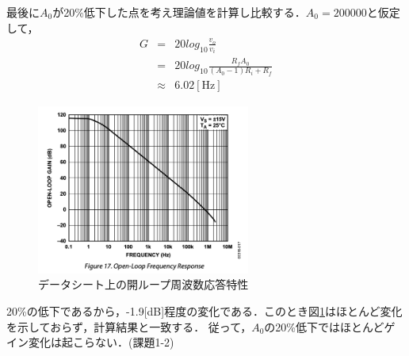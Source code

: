 \documentclass[dvipdfmx,titlepage,a4j]{jsarticle}  %
\begin{document}
最後に$A_0$が20\%低下した点を考え理論値を計算し比較する．$A_0 = 200000$と仮定して，
\begin{eqnarray}
  G &=& 20 log_{10} \frac{v_o}{v_i} \nonumber \\
  &=& 20 log_{10} \frac{R_f A_0}{(A_0 - 1)R_i + R_f} \nonumber \\
  &\approx& 6.02 \mathrm{[Hz]}
\end{eqnarray}

\begin{figure}[H]
  \begin{center}
      \includegraphics[width=7cm]{../image/fig17.png}
      \caption{データシート上の開ループ周波数応答特性}
      \label{fig:17}
  \end{center}
\end{figure}

20\%の低下であるから，-1.9[dB]程度の変化である．このとき図\ref{fig:17}はほとんど変化を示しておらず，計算結果と一致する．
従って，$A_0$の20\%低下ではほとんどゲイン変化は起こらない．(課題1-2)
\end{document}
